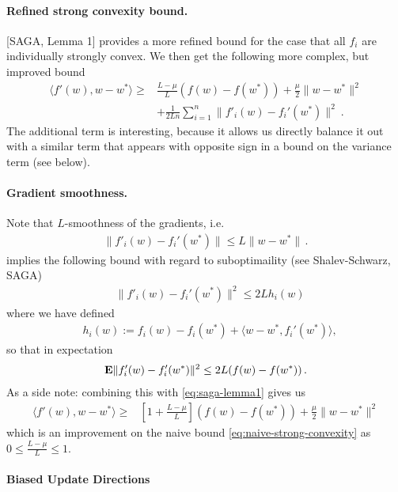 \documentclass{article}
\newcommand{\E}{{\bf E}}
\begin{document}
\paragraph{Refined strong convexity bound.}
[SAGA, Lemma 1] provides a more refined bound for the case that all $f_i$ are individually strongly convex. We then get the following more complex, but improved bound 
\begin{align}
\langle f'(w), w-w^* \rangle 
\ge &  \frac{L-\mu}{L} (f(w) - f(w^*)) + \frac \mu 2  \| w-w^*\|^2    \label{eq:saga-lemma1}\\
& + \frac{1}{2Ln} \sum_{i=1}^n \| f'_i(w) - f_i'(w^*) \|^2 \ . \nonumber
\end{align}
The additional term is interesting, because it allows us directly balance it out with a similar term that appears with opposite sign in a bound on the variance term (see below). 

\paragraph{Gradient smoothness.} Note that $L$-smoothness of the gradients, i.e.~ 
\begin{align}
\| f'_i(w) - f_i'(w^*) \| \le L\| w - w^*\| \,.
\end{align}
implies the following bound with regard to suboptimaility (see Shalev-Schwarz, SAGA) 
\begin{align}
& \| f'_i(w) - f_i'(w^*) \|^2 \le 2L h_i(w)
\end{align}
where we have defined
\begin{align}
& h_i(w)  := f_i(w) - f_i(w^*)+  \langle w-w^*, f_i'(w^*) \rangle, 
\end{align}
so that in  expectation
\begin{align}
\E \| f_i'(w) - f_i'(w^*)\|^2 \le 2L (f(w) - f(w^*))\,.
\label{eq:smoothness-suboptimaility-bound}
\end{align}
As a side note: combining this with \eqref{eq:saga-lemma1} gives us 
\begin{align}
\langle f'(w), w-w^* \rangle  \ge &  
\left[ 1 + \frac{L-\mu}{L} \right] (f(w) - f(w^*))+ \frac \mu 2  \| w-w^*\|^2 
\end{align}
which is an improvement on the naive bound \eqref{eq:naive-strong-convexity} as $0 \leq \frac{L-\mu}{L} \leq 1$. 

\paragraph{Biased Update Directions} 
\end{document}
